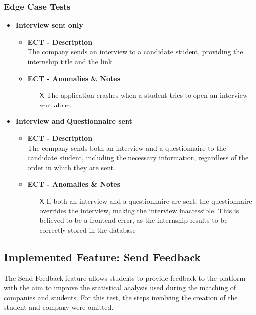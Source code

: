 \subsubsection{Edge Case Tests}
\begin{itemize} [label= {\color{titleColor}\(\diamond\)}]
    \item \textbf{\color{titleColor} Interview sent only}
    \begin{itemize}
        \item \textbf{\color{titleColor} ECT - Description}\\ The company sends an interview to a candidate student, providing the internship title and the link
        \item \textbf{\color{titleColor} ECT - Anomalies \& Notes}
        \begin{itemize}
            \item [{\color{titleColor}\(\mathsf{X}\)}] The application crashes when a student tries to open an interview sent alone.
        \end{itemize} 
    \end{itemize}
    \item \textbf{\color{titleColor} Interview and Questionnaire sent}
    \begin{itemize}
        \item \textbf{\color{titleColor} ECT - Description}\\ The company sends both an interview and a questionnaire to the candidate student, including the necessary information, regardless of the order in which they are sent.
        \item \textbf{\color{titleColor} ECT - Anomalies \& Notes}
        \begin{itemize}
            \item [{\color{titleColor}\(\mathsf{X}\)}] If both an interview and a questionnaire are sent, the questionnaire overrides the interview, making the interview inaccessible. This is believed to be a frontend error, as the internship results to be correctly  stored in the database
        \end{itemize}
    \end{itemize}
\end{itemize}

\subsection{Implemented Feature: Send Feedback}
The Send Feedback feature allows students to provide feedback to the platform with the aim to improve the statistical analysis used during the matching of companies and students. For this test, the steps involving the creation of the student and company were omitted.
